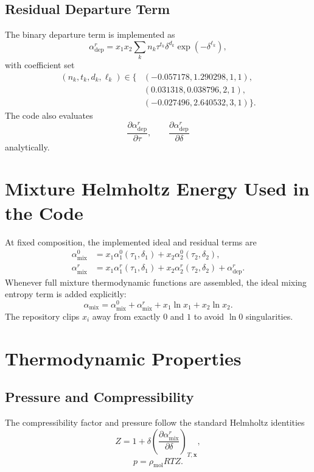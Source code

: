 \documentclass[11pt]{article}
\begin{document}
\subsection{Residual Departure Term}
The binary departure term is implemented as
\begin{equation}
\alpha_{\mathrm{dep}}^r
= x_1 x_2 \sum_k n_k \tau^{t_k} \delta^{d_k}
\exp\!\left(-\delta^{\ell_k}\right),
\end{equation}
with coefficient set
\begin{align}
(n_k,t_k,d_k,\ell_k) \in
\{&
(-0.057178,1.290298,1,1), \nonumber\\
&(0.031318,0.038796,2,1), \nonumber\\
&(-0.027496,2.640532,3,1)\}.
\end{align}
The code also evaluates
\begin{equation}
\frac{\partial \alpha_{\mathrm{dep}}^r}{\partial \tau},
\qquad
\frac{\partial \alpha_{\mathrm{dep}}^r}{\partial \delta}
\end{equation}
analytically.

\section{Mixture Helmholtz Energy Used in the Code}
At fixed composition, the implemented ideal and residual terms are
\begin{align}
\alpha_{\mathrm{mix}}^0 &= x_1 \alpha_1^0(\tau_1,\delta_1) + x_2 \alpha_2^0(\tau_2,\delta_2), \\
\alpha_{\mathrm{mix}}^r &= x_1 \alpha_1^r(\tau_1,\delta_1) + x_2 \alpha_2^r(\tau_2,\delta_2)
+ \alpha_{\mathrm{dep}}^r.
\end{align}
Whenever full mixture thermodynamic functions are assembled, the ideal mixing entropy term is added explicitly:
\begin{equation}
\alpha_{\mathrm{mix}}
= \alpha_{\mathrm{mix}}^0 + \alpha_{\mathrm{mix}}^r
+ x_1 \ln x_1 + x_2 \ln x_2.
\end{equation}
The repository clips $x_i$ away from exactly $0$ and $1$ to avoid $\ln 0$ singularities.

\section{Thermodynamic Properties}
\subsection{Pressure and Compressibility}
The compressibility factor and pressure follow the standard Helmholtz identities
\begin{equation}
Z = 1 + \delta \left(\frac{\partial \alpha_{\mathrm{mix}}^r}{\partial \delta}\right)_{T,\bm{x}},
\end{equation}
\begin{equation}
p = \rho_{\mathrm{mol}} R T Z.
\end{equation}
\end{document}

